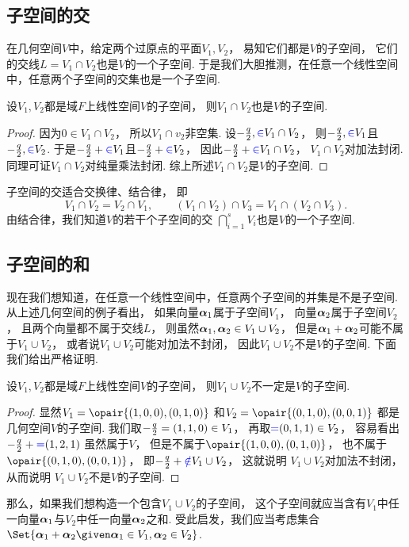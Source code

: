\subsection{子空间的交}
在几何空间\(V\)中，给定两个过原点的平面\(V_1,V_2\)，
易知它们都是\(V\)的子空间，
它们的交线\(L = V_1 \cap V_2\)也是\(V\)的一个子空间.
于是我们大胆推测，在任意一个线性空间中，任意两个子空间的交集也是一个子空间.
\begin{theorem}
设\(V_1,V_2\)都是域\(F\)上线性空间\(V\)的子空间，
则\(V_1 \cap V_2\)也是\(V\)的子空间.
\begin{proof}
因为\(0\in V_1 \cap V_2\)，
所以\(V_1 \cap v_2\)非空集.
设\(-\frac{q}{2},\textcolor{blue}\in V_1 \cap V_2\)，
则\(-\frac{q}{2},\textcolor{blue}\in V_1\)且\(-\frac{q}{2},\textcolor{blue}\in V_2\).
于是\(-\frac{q}{2}+\textcolor{blue}\in V_1\)且\(-\frac{q}{2}+\textcolor{blue}\in V_2\)，
因此\(-\frac{q}{2}+\textcolor{blue}\in V_1 \cap V_2\)，
\(V_1 \cap V_2\)对加法封闭.
同理可证\(V_1 \cap V_2\)对纯量乘法封闭.
综上所述\(V_1 \cap V_2\)是\(V\)的子空间.
\end{proof}
\end{theorem}

子空间的交适合交换律、结合律，
即\[
	V_1 \cap V_2
	=V_2 \cap V_1, \qquad
	(V_1 \cap V_2) \cap V_3
	=V_1 \cap (V_2 \cap V_3).
\]
由结合律，我们知道\(V\)的若干个子空间的交
\(\bigcap_{i=1}^s V_i\)也是\(V\)的一个子空间.

\subsection{子空间的和}
现在我们想知道，在任意一个线性空间中，任意两个子空间的并集是不是子空间.
从上述几何空间的例子看出，
如果向量\(\boldsymbol\alpha_1\)属于子空间\(V_1\)，
向量\(\boldsymbol\alpha_2\)属于子空间\(V_2\)，
且两个向量都不属于交线\(L\)，
则虽然\(\boldsymbol\alpha_1,\boldsymbol\alpha_2 \in V_1 \cup V_2\)，
但是\(\boldsymbol\alpha_1 + \boldsymbol\alpha_2\)可能不属于\(V_1 \cup V_2\)，
或者说\(V_1 \cup V_2\)可能对加法不封闭，
因此\(V_1 \cup V_2\)不是\(V\)的子空间.
下面我们给出严格证明.
\begin{proposition}
设\(V_1,V_2\)都是域\(F\)上线性空间\(V\)的子空间，
则\(V_1 \cup V_2\)不一定是\(V\)的子空间.
\begin{proof}
显然\(V_1=\opair{(1,0,0),(0,1,0)}\)
和\(V_2=\opair{(0,1,0),(0,0,1)}\)
都是几何空间\(V\)的子空间.
我们取\(-\frac{q}{2}=(1,1,0)\in V_1\)，
再取\(\textcolor{blue}=(0,1,1)\in V_2\)，
容易看出\(-\frac{q}{2}+\textcolor{blue}=(1,2,1)\)
虽然属于\(V\)，
但是不属于\(\opair{(1,0,0),(0,1,0)}\)，
也不属于\(\opair{(0,1,0),(0,0,1)}\)，
即\(-\frac{q}{2}+\textcolor{blue}\notin V_1 \cup V_2\)，
这就说明
\(V_1 \cup V_2\)对加法不封闭，
从而说明
\(V_1 \cup V_2\)不是\(V\)的子空间.
\end{proof}
\end{proposition}
那么，如果我们想构造一个包含\(V_1 \cup V_2\)的子空间，
这个子空间就应当含有\(V_1\)中任一向量\(\boldsymbol\alpha_1\)与\(V_2\)中任一向量\(\boldsymbol\alpha_2\)之和.
受此启发，我们应当考虑集合
\(\Set{ \vb\alpha_1 + \vb\alpha_2 \given \vb\alpha_1 \in V_1,\vb\alpha_2 \in V_2 }\).

